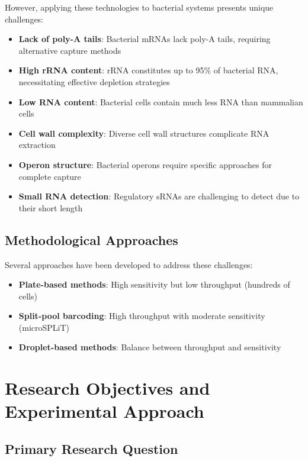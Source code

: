 \documentclass[
  11pt,
  a4paper,
]{report}
\providecommand{\tightlist}{%
  \setlength{\itemsep}{0pt}\setlength{\parskip}{0pt}}\usepackage{longtable,booktabs,array}
\begin{document}
However, applying these technologies to bacterial systems presents
unique challenges:

\begin{itemize}
\tightlist
\item
  \textbf{Lack of poly-A tails}: Bacterial mRNAs lack poly-A tails,
  requiring alternative capture methods
\item
  \textbf{High rRNA content}: rRNA constitutes up to 95\% of bacterial
  RNA, necessitating effective depletion strategies
\item
  \textbf{Low RNA content}: Bacterial cells contain much less RNA than
  mammalian cells
\item
  \textbf{Cell wall complexity}: Diverse cell wall structures complicate
  RNA extraction
\item
  \textbf{Operon structure}: Bacterial operons require specific
  approaches for complete capture
\item
  \textbf{Small RNA detection}: Regulatory sRNAs are challenging to
  detect due to their short length
\end{itemize}

\subsection{Methodological Approaches}\label{methodological-approaches}

Several approaches have been developed to address these challenges:

\begin{itemize}
\tightlist
\item
  \textbf{Plate-based methods}: High sensitivity but low throughput
  (hundreds of cells)
\item
  \textbf{Split-pool barcoding}: High throughput with moderate
  sensitivity (microSPLiT)
\item
  \textbf{Droplet-based methods}: Balance between throughput and
  sensitivity
\end{itemize}

\section{Research Objectives and Experimental
Approach}\label{research-objectives-and-experimental-approach}

\subsection{Primary Research Question}\label{primary-research-question}
\end{document}
